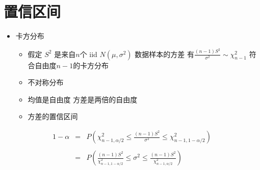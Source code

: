 \documentclass[
]{book}
\providecommand{\tightlist}{%
  \setlength{\itemsep}{0pt}\setlength{\parskip}{0pt}}
\begin{document}
\hypertarget{ux7f6eux4fe1ux533aux95f4}{%
\section{置信区间}\label{ux7f6eux4fe1ux533aux95f4}}

\begin{itemize}
\tightlist
\item
  卡方分布

  \begin{itemize}
  \tightlist
  \item
    假定 \(S^2\) 是来自\(n\)个 iid \(N(\mu,\sigma^2)\) 数据样本的方差 有\(\frac{(n - 1) S^2}{\sigma^2} \sim \chi^2_{n-1}\) 符合自由度\(n-1\)的卡方分布
  \item
    不对称分布
  \item
    均值是自由度 方差是两倍的自由度
  \item
    方差的置信区间
  \end{itemize}
\end{itemize}

\begin{eqnarray*}
  1 - \alpha & = & P \left( \chi^2_{n-1, \alpha/2} \leq  \frac{(n - 1) S^2}{\sigma^2} \leq  \chi^2_{n-1,1 - \alpha/2} \right) \\ \\
& = &  P\left(\frac{(n-1)S^2}{\chi^2_{n-1,1-\alpha/2}} \leq \sigma^2 \leq 
\frac{(n-1)S^2}{\chi^2_{n-1,\alpha/2}} \right) \\
\end{eqnarray*}
\end{document}
